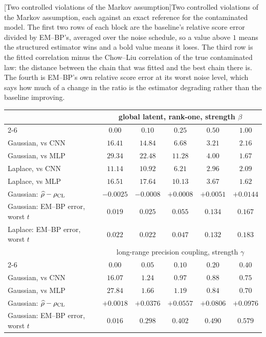 \begin{center}
\begin{minipage}{\linewidth}\small\centering
{}[Two controlled violations of the Markov assumption]{Two controlled violations of the Markov assumption, each
against an exact reference for the contaminated model. The first two rows of
each block are the baseline's relative score error divided by EM--BP's,
averaged over the noise schedule, so a value above $1$ means the structured
estimator wins and a bold value means it loses. The third row is the fitted
correlation minus the Chow--Liu correlation of the true contaminated law: the
distance between the chain that was fitted and the best chain there is. The
fourth is EM--BP's own relative score error at its worst noise level, which
says how much of a change in the ratio is the estimator degrading rather than
the baseline improving.}
\label{tab:nonmarkov}
\begin{tabular}{@{}lccccc@{}}
\toprule
& \multicolumn{5}{c}{global latent, rank-one, strength $\beta$} \\
\cmidrule(lr){2-6}
& $0.00$ & $0.10$ & $0.25$ & $0.50$ & $1.00$ \\
\midrule
Gaussian, vs CNN & $16.41$ & $14.84$ & $6.68$ & $3.21$ & $2.16$ \\
Gaussian, vs MLP & $29.34$ & $22.48$ & $11.28$ & $4.00$ & $1.67$ \\
Laplace, vs CNN & $11.14$ & $10.92$ & $6.21$ & $2.96$ & $2.09$ \\
Laplace, vs MLP & $16.51$ & $17.64$ & $10.13$ & $3.67$ & $1.62$ \\
Gaussian: $\widehat{\rho} - \rho_{\mathrm{CL}}$ & $-0.0025$ & $-0.0008$ & $+0.0008$ & $+0.0051$ & $+0.0144$ \\
Gaussian: EM--BP error, worst $t$ & $0.019$ & $0.025$ & $0.055$ & $0.134$ & $0.167$ \\
Laplace: EM--BP error, worst $t$ & $0.022$ & $0.022$ & $0.047$ & $0.132$ & $0.183$ \\
\midrule
& \multicolumn{5}{c}{long-range precision coupling, strength $\gamma$} \\
\cmidrule(lr){2-6}
& $0.00$ & $0.05$ & $0.10$ & $0.20$ & $0.40$ \\
\midrule
Gaussian, vs CNN & $16.07$ & $1.24$ & $\mathbf{0.97}$ & $\mathbf{0.88}$ & $\mathbf{0.75}$ \\
Gaussian, vs MLP & $27.84$ & $1.66$ & $1.19$ & $\mathbf{0.84}$ & $\mathbf{0.70}$ \\
Gaussian: $\widehat{\rho} - \rho_{\mathrm{CL}}$ & $+0.0018$ & $+0.0376$ & $+0.0557$ & $+0.0806$ & $+0.0976$ \\
Gaussian: EM--BP error, worst $t$ & $0.016$ & $0.298$ & $0.402$ & $0.490$ & $0.579$ \\
\bottomrule
\end{tabular}
\end{minipage}
\end{center}
